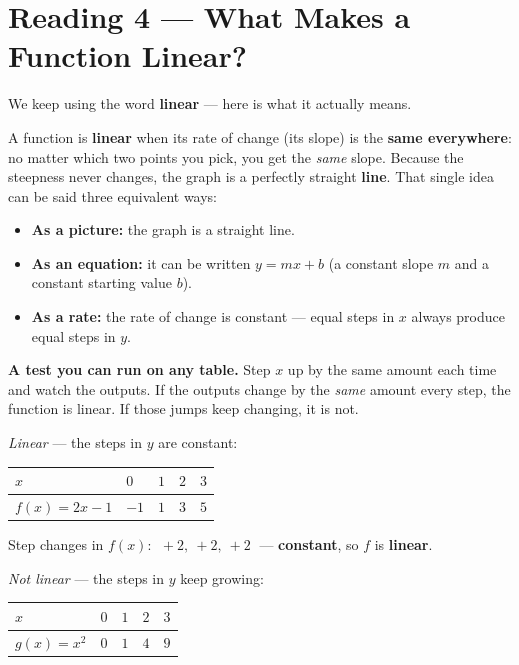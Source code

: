 \documentclass[12pt]{article}
\begin{document}

\newpage
\section*{Reading 4 --- What Makes a Function Linear?}
We keep using the word \textbf{linear} --- here is what it actually means.

A function is \textbf{linear} when its rate of change (its slope) is the \textbf{same everywhere}: no matter which
two points you pick, you get the \emph{same} slope. Because the steepness never changes, the graph is a perfectly
straight \textbf{line}. That single idea can be said three equivalent ways:
\begin{itemize}
  \item \textbf{As a picture:} the graph is a straight line.
  \item \textbf{As an equation:} it can be written $y = mx + b$ (a constant slope $m$ and a constant starting
        value $b$).
  \item \textbf{As a rate:} the rate of change is constant --- equal steps in $x$ always produce equal steps in
        $y$.
\end{itemize}

\textbf{A test you can run on any table.} Step $x$ up by the same amount each time and watch the outputs. If the
outputs change by the \emph{same} amount every step, the function is linear. If those jumps keep changing, it is
not.

\medskip
\textit{Linear} --- the steps in $y$ are constant:

\medskip
\renewcommand{\arraystretch}{1.5}
\begin{tabular}{|C{2.6cm}|C{1.2cm}|C{1.2cm}|C{1.2cm}|C{1.2cm}|}
\hline
$x$ & $0$ & $1$ & $2$ & $3$ \\
\hline
$f(x) = 2x-1$ & $-1$ & $1$ & $3$ & $5$ \\
\hline
\end{tabular}
\renewcommand{\arraystretch}{1}

Step changes in $f(x)$: $\;+2,\ +2,\ +2\;$ --- \textbf{constant}, so $f$ is \textbf{linear}.

\medskip
\textit{Not linear} --- the steps in $y$ keep growing:

\medskip
\renewcommand{\arraystretch}{1.5}
\begin{tabular}{|C{2.6cm}|C{1.2cm}|C{1.2cm}|C{1.2cm}|C{1.2cm}|}
\hline
$x$ & $0$ & $1$ & $2$ & $3$ \\
\hline
$g(x) = x^2$ & $0$ & $1$ & $4$ & $9$ \\
\hline
\end{tabular}
\renewcommand{\arraystretch}{1}
\end{document}
